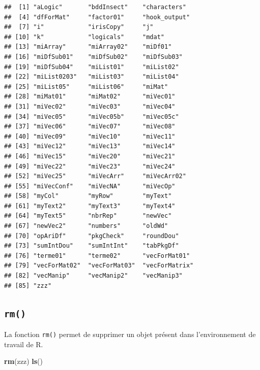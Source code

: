 \documentclass[twoside,symmetric]{book}
\newenvironment{Shaded}{}{}
\newcommand{\KeywordTok}[1]{\textbf{#1}}
\newcommand{\NormalTok}[1]{#1}
\begin{document}
\begin{verbatim}
##  [1] "aLogic"       "bddInsect"    "characters"  
##  [4] "dfForMat"     "factor01"     "hook_output" 
##  [7] "i"            "irisCopy"     "j"           
## [10] "k"            "logicals"     "mdat"        
## [13] "miArray"      "miArray02"    "miDf01"      
## [16] "miDfSub01"    "miDfSub02"    "miDfSub03"   
## [19] "miDfSub04"    "miList01"     "miList02"    
## [22] "miList0203"   "miList03"     "miList04"    
## [25] "miList05"     "miList06"     "miMat"       
## [28] "miMat01"      "miMat02"      "miVec01"     
## [31] "miVec02"      "miVec03"      "miVec04"     
## [34] "miVec05"      "miVec05b"     "miVec05c"    
## [37] "miVec06"      "miVec07"      "miVec08"     
## [40] "miVec09"      "miVec10"      "miVec11"     
## [43] "miVec12"      "miVec13"      "miVec14"     
## [46] "miVec15"      "miVec20"      "miVec21"     
## [49] "miVec22"      "miVec23"      "miVec24"     
## [52] "miVec25"      "miVecArr"     "miVecArr02"  
## [55] "miVecConf"    "miVecNA"      "miVecOp"     
## [58] "myCol"        "myRow"        "myText"      
## [61] "myText2"      "myText3"      "myText4"     
## [64] "myText5"      "nbrRep"       "newVec"      
## [67] "newVec2"      "numbers"      "oldWd"       
## [70] "opAriDf"      "pkgCheck"     "roundDou"    
## [73] "sumIntDou"    "sumIntInt"    "tabPkgDf"    
## [76] "terme01"      "terme02"      "vecForMat01" 
## [79] "vecForMat02"  "vecForMat03"  "vecForMatrix"
## [82] "vecManip"     "vecManip2"    "vecManip3"   
## [85] "zzz"
\end{verbatim}

\hypertarget{l015rm}{%
\subsection{\texorpdfstring{\texttt{rm()}}{rm()}}\label{l015rm}}

La fonction \texttt{rm()} permet de supprimer un objet présent dans l'environnement de travail de R.

\begin{Shaded}
\begin{Highlighting}[]
\KeywordTok{rm}\NormalTok{(zzz)}
\KeywordTok{ls}\NormalTok{()}
\end{Highlighting}
\end{Shaded}
\end{document}
